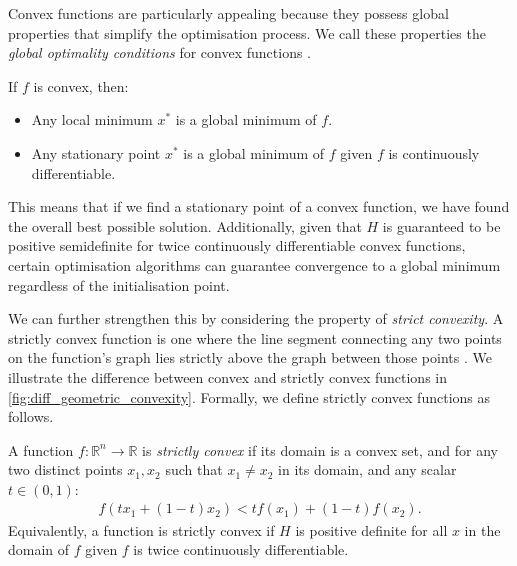 Convex functions are particularly appealing because they possess global properties that simplify the optimisation process. We call these properties the \textit{global optimality conditions} for convex functions \citep{cvbook, NoceWrig06}.

\begin{definition}
    If $f$ is convex, then: 
    \begin{itemize}
        \item Any local minimum $x^*$ is a global minimum of $f$.
        \item Any stationary point $x^*$ is a global minimum of $f$ given $f$ is continuously differentiable.
    \end{itemize}
\end{definition}

This means that if we find a stationary point of a convex function, we have found the overall best possible solution. Additionally, given that $H$ is guaranteed to be positive semidefinite for twice continuously differentiable convex functions, certain optimisation algorithms can guarantee convergence to a global minimum regardless of the initialisation point. 

We can further strengthen this by considering the property of \textit{strict convexity}. A strictly convex function is one where the line segment connecting any two points on the function's graph lies strictly above the graph between those points \citep{cvbook, NoceWrig06}. We illustrate the difference between convex and strictly convex functions in \cref{fig:diff_geometric_convexity}. Formally, we define strictly convex functions as follows.
\begin{definition}
    A function $f: \mathbb{R}^n \to \mathbb{R}$ is \textit{strictly convex} if its domain is a convex set, and for any two distinct points $x_1, x_2$ such that $x_1 \neq x_2$ in its domain, and any scalar $t \in (0, 1)$:
    \begin{align}
        f(t x_1 + (1-t)x_2) < t f(x_1) + (1-t)f(x_2).
    \end{align}
    Equivalently, a function is strictly convex if $H$ is positive definite for all $x$ in the domain of $f$ given $f$ is twice continuously differentiable.
\end{definition}

